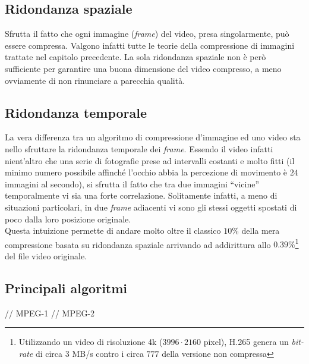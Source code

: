 
\subsection{Ridondanza spaziale}

Sfrutta il fatto che ogni immagine (\emph{frame}) del video, presa 
singolarmente, può essere compressa. Valgono infatti tutte le teorie della 
compressione di immagini trattate nel capitolo precedente.
La sola ridondanza spaziale non è però sufficiente per garantire una buona 
dimensione del video compresso, a meno ovviamente di non rinunciare a parecchia 
qualità.


\subsection{Ridondanza temporale}

La vera differenza tra un algoritmo di compressione d'immagine ed uno video sta 
nello sfruttare la ridondanza temporale dei \emph{frame}. Essendo il video 
infatti nient'altro che una serie di fotografie prese ad intervalli costanti e 
molto fitti (il minimo numero possibile affinché l'occhio abbia la percezione 
di movimento è $24$ immagini al secondo), si sfrutta il fatto che tra due 
immagini ``vicine'' temporalmente vi sia una forte correlazione. Solitamente 
infatti, a meno di situazioni particolari, in due \emph{frame} adiacenti vi 
sono gli stessi oggetti spostati di poco dalla loro posizione originale.\\

Questa intuizione permette di andare molto oltre il classico $10\%$ della mera 
compressione basata su ridondanza spaziale arrivando ad addirittura allo 
$0.39\%$\footnote{Utilizzando un video di risoluzione 4k ($3996 \cdot 2160$ 
pixel), H.265 genera un \emph{bit-rate} di circa $3$ MB/s contro i circa $777$ 
della versione non compressa} del file video originale. 


\subsection{Principali algoritmi}

// MPEG-1
// MPEG-2
